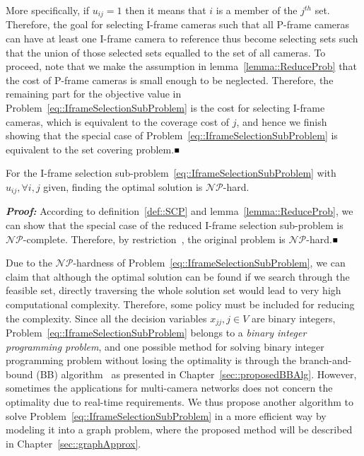 More specifically, if $u_{ij} = 1$ then it means that $i$ is a member of the $j^{th}$ set.
Therefore, the goal for selecting I-frame cameras such that all P-frame cameras can have at least one I-frame camera to reference thus become selecting sets such that the union of those selected sets equalled to the set of all cameras.
To proceed, note that we make the assumption in lemma~\ref{lemma::ReduceProb} that the cost of P-frame cameras is small enough to be neglected.
Therefore, the remaining part for the objective value in Problem~\eqref{eq::IframeSelectionSubProblem} is the cost for selecting I-frame cameras, which is equivalent to the coverage cost of $j$, and hence we finish showing that the special case of Problem~\eqref{eq::IframeSelectionSubProblem} is equivalent to the set covering problem.\hfill$\mathsmaller{\mathsmaller{\blacksquare}}$

\begin{mythm}
For the I-frame selection sub-problem~\eqref{eq::IframeSelectionSubProblem} with $u_{ij}, \forall i,j$ given, finding the optimal solution is $\mathcal{NP}$-hard.
\end{mythm}
\textbf{\emph{Proof:}}
According to definition~\ref{def::SCP} and lemma~\ref{lemma::ReduceProb}, we can show that the special case of the reduced I-frame selection sub-problem is $\mathcal{NP}$-complete.
Therefore, by restriction~\cite{Restriction}, the original problem is $\mathcal{NP}$-hard.\hfill$\mathsmaller{\mathsmaller{\blacksquare}}$

Due to the $\mathcal{NP}$-hardness of Problem~\eqref{eq::IframeSelectionSubProblem}, we can claim that although the optimal solution can be found if we search through the feasible set, directly traversing the whole solution set would lead to very high computational complexity.
Therefore, some policy must be included for reducing the complexity.
Since all the decision variables ${x_{jj},j \in V}$ are binary integers, Problem~\eqref{eq::IframeSelectionSubProblem} belongs to a \emph{binary integer programming problem}, and one possible method for solving binary integer programming problem without losing the optimality is through the branch-and-bound (BB) algorithm~\cite{BB} as presented in Chapter~\ref{sec::proposedBBAlg}.
However, sometimes the applications for multi-camera networks does not concern the optimality due to real-time requirements.
We thus propose another algorithm to solve Problem~\eqref{eq::IframeSelectionSubProblem} in a more efficient way by modeling it into a graph problem, where the proposed method will be described in Chapter~\ref{sec::graphApprox}.
%